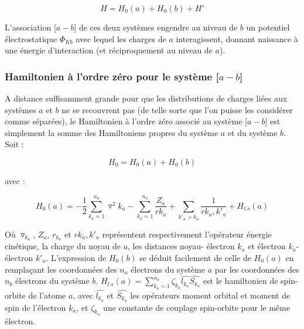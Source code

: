 	\begin{equation}
	H = H_{0}(a) + H_{0}(b) + H'
	\end{equation}
	
	L'association [$a-b$] de ces deux systèmes engendre au niveau de $b$ un potentiel électrostatique $\Phi_{Kb}$ avec lequel les charges de $a$ interagissent, donnant naissance à une énergie d'interaction (et réciproquement au niveau de $a$).
	
	\subsubsection{Hamiltonien à l'ordre zéro pour le système [$a-b$]}
	
	A distance suffisamment grande pour que les distributions de charges liées aux systèmes $a$ et $b$ ne se recouvrent pas (de telle sorte que l'on puisse les considérer comme séparées), le Hamiltonien à l'ordre zéro associé au système [$a-b$] est simplement la somme des Hamiltoniens propres du système $a$ et du système $b$. Soit : 
	
	\begin{equation}
	H_{0} = H_{0}(a) + H_{0}(b) \label{1.2}
	\end{equation}
	
	\noindent avec : 
	
	\begin{equation}
	H_{0}(a) = -\frac{1}{2} \sum_{k_{a}=1}^{n_{a}} \triangledown^{2} k_{a} - \sum_{k_{a}=1}^{n_{a}} \frac{Z_{a}}{rk_{a}} + \sum_{k'_{a}>k_{a}} \frac{1}{rk_{a},k'_{a}} + H_{l.s}(a)  \label{1.3}
	\end{equation}
	
	Où $\triangledown_{k_{a}}$, $Z_{a}$, $r_{k_{a}}$ et $rk_{a},k'_{a}$ représentent respectivement l'opérateur énergie cinétique, la charge du noyau de $a$, les distances noyau- électron $k_{a}$ et électron $k_{a}$- électron $k'_{a}$. L'expression de $H_{0}(b)$ se déduit facilement de celle de $H_{0}(a)$ en remplaçant les coordonnées des $n_{a}$ électrons du système $a$ par les coordonnées des $n_{b}$ électrons du système $b$. $H_{l.s}(a)= \sum_{k_{a}=1}^{n_{a}} \zeta_{k_{a}} \widehat{l_{k_{a}}} \widehat{S_{k_{a}}}$ est le hamiltonien de spin-orbite de l'atome $a$, avec $\widehat{l_{k_{a}}}$ et $\widehat{S_{k_{a}}}$ les opérateurs moment orbital et moment de spin de l'électron $k_{a}$, et $\zeta_{k_{a}}$ une constante de couplage spin-orbite pour le même électron.
	
